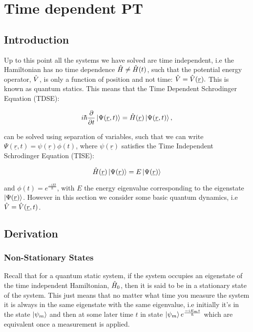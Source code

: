 \chapter{Time dependent PT}
\label{chapt7}

\section{Introduction}

Up to this point all the systems we have solved are time independent, i.e the Hamiltonian has no time dependence $\Hat{H} \neq \Hat{H}(t)$, such that the potential energy operator, $\Hat{V}$, is only a function of position and not time: $\Hat{V} = \Hat{V}(\underline{r}).$ This is known as quantum statics. This means that the Time Dependent Schrodinger Equation (TDSE):

\begin{equation}
    i\hbar \frac{\partial}{\partial t} \ket{\Psi(\underline{r}, t)} = \Hat{H}(\underline{r}) \ket{\Psi(\underline{r}, t)}
    \label{TDSE},
\end{equation}

\noindent can be solved using separation of variables, such that we can write $\Psi(\underline{r}, t) = \psi(\underline{r}) \phi(t)$, where $\psi(\underline{r})$ satisfies the Time Independent Schrodinger Equation (TISE):

\begin{equation}
    \Hat{H}(\underline{r}) \ket{\Psi(\underline{r})} = E \ket{\Psi(\underline{r})}
    \label{TISE}
\end{equation}

\noindent and $\phi(t) = e^{\frac{-iEt}{\hbar}}$, with $E$ the energy eigenvalue corresponding to the eigenstate $\ket{\Psi(\underline{r})}$. However in this section we consider some basic quantum dynamics, i.e $\Hat{V} = \Hat{V}(\underline{r}, t)$.

\section{Derivation}

\subsection{Non-Stationary States}

Recall that for a quantum static system, if the system occupies an eigenstate of the time independent Hamiltonian, $\Hat{H}_0$, then it is said to be in a stationary state of the system. This just means that no matter what time you measure the system it is always in the same eigenstate with the same eigenvalue, i.e initially it's in the state $\ket{\psi_m}$ and then at some later time $t$ in state $\ket{\psi_m} e^\frac{-iE_m t}{\hbar}$ which are equivalent once a measurement is applied.

